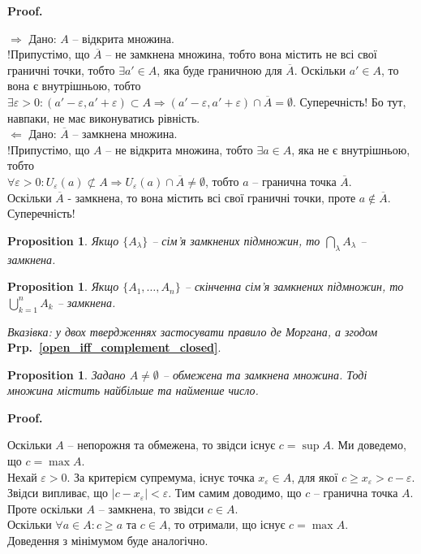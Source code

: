 \documentclass[a4paper, 14pt]{article}
\makeatletter
\def\qed{$\blacksquare$}
\def\rightproof{$\boxed{\Rightarrow}$ }
\def\leftproof{$\boxed{\Leftarrow}$ }
\theoremstyle{theoremdd}
\theoremstyle{theoremdd}
\theoremstyle{theoremdd}
\theoremstyle{theoremdd}
\theoremstyle{theoremdd}
\newtheorem{proposition}[theorem]{Proposition}
\theoremstyle{theoremdd}
\theoremstyle{theoremdd}
\theoremstyle{theoremdd}
\renewenvironment{proof}[1][Proof.\\]{\par
\pushQED{\hfill \qed}%
\normalfont \topsep6\p@\@plus6\p@\relax
\trivlist
\item\relax
{\bfseries
#1\@addpunct{.}}\hspace\labelsep\ignorespaces
}{%
\popQED\endtrivlist\@endpefalse
}
\newcommand\prpref[1]{\textbf{Prp.~\ref{#1}}}
\makeatother
\begin{document}
\begin{proof}
\rightproof Дано: $A$ -- відкрита множина.\\
!Припустімо, що $\overline{A}$ -- не замкнена множина, тобто вона містить не всі свої граничні точки, тобто $\exists a' \in A$, яка буде граничною для $\overline{A}$. Оскільки $a' \in A$, то вона є внутрішньою, тобто $\exists \varepsilon > 0: (a'-\varepsilon,a'+\varepsilon) \subset A \Rightarrow (a'-\varepsilon,a'+\varepsilon) \cap \overline{A} = \emptyset$. Суперечність! Бо тут, навпаки, не має виконуватись рівність.
\bigskip \\
\leftproof Дано: $\overline{A}$ -- замкнена множина.\\
!Припустімо, що $A$ -- не відкрита множина, тобто $\exists a \in A$, яка не є внутрішньою, тобто\\
$\forall \varepsilon > 0: U_{\varepsilon}(a) \not\subset A \Rightarrow U_{\varepsilon}(a) \cap \overline{A} \neq \emptyset$, тобто $a$ -- гранична точка $\overline{A}$.\\
Оскільки $\overline{A}$ - замкнена, то вона містить всі свої граничні точки, проте $a \notin \overline{A}$. Суперечність!
\end{proof}

\begin{proposition}
Якщо $\{A_{\lambda}\}$ -- сім'я замкнених підмножин, то $\displaystyle \bigcap_{\lambda} A_{\lambda}$ -- замкнена.
\end{proposition}

\begin{proposition}
Якщо $\{A_1,\dots,A_n\}$ -- скінченна сім'я замкнених підмножин, то $\displaystyle\bigcup_{k=1}^n A_k$ -- замкнена.
\end{proposition}

\textit{Вказівка: у двох твердженнях застосувати правило де Моргана, а згодом } \prpref{open_iff_complement_closed}.

\begin{proposition}
Задано $A \neq \emptyset$ -- обмежена та замкнена множина. Тоді множина містить найбільше та найменше число. 
\end{proposition}

\begin{proof}
Оскільки $A$ -- непорожня та обмежена, то звідси існує $c = \sup A$. Ми доведемо, що $c = \max A$.\\
Нехай $\varepsilon > 0$. За критерієм супремума, існує точка $x_\varepsilon \in A$, для якої $c \geq x_\varepsilon > c - \varepsilon$. Звідси випливає, що $|c-x_\varepsilon| < \varepsilon$. Тим самим доводимо, що $c$ -- гранична точка $A$. Проте оскільки $A$ -- замкнена, то звідси $c \in A$.\\
Оскільки $\forall a \in A: c \geq a$ та $c \in A$, то отримали, що існує $c = \max A$.\\
Доведення з мінімумом буде аналогічно.
\end{proof}
\end{document}
